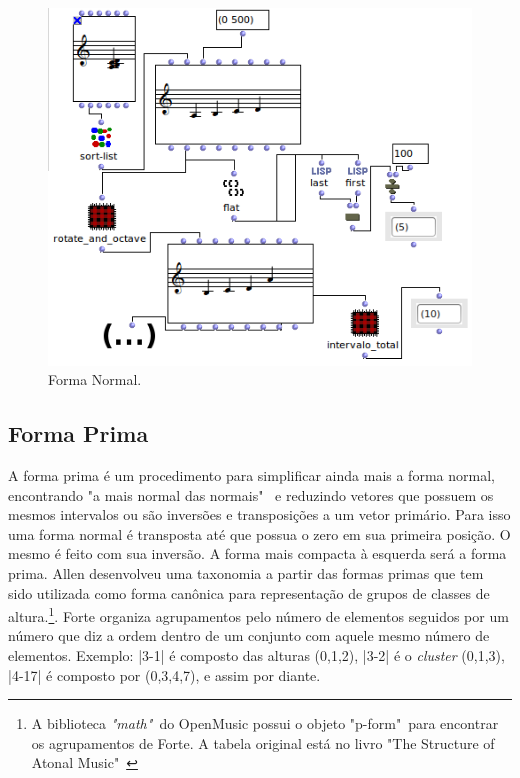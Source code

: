 \documentclass[
	12pt,				%
	openright,			%
	twoside,			%
	a4paper,			%
	english,			%
	french,				%
	spanish,			%
	brazil				%
	]{abntex2}
\begin{document}
\begin{figure}[h]
	\caption{\label{fig_grafico}Forma Normal. }
	\begin{center}
	    \includegraphics[scale=0.7]{OM_settheory/forma_normal.png}
	\end{center}
\end{figure}



\pagebreak
\subsection{Forma Prima} 

A forma prima é um procedimento para simplificar ainda mais a forma normal, encontrando "a mais normal das normais"\ \cite[p. 47]{straus2004} e reduzindo vetores que possuem os mesmos intervalos ou são inversões e transposições a um vetor primário. Para isso uma forma normal é transposta até que possua o zero em sua primeira posição. O mesmo é feito com sua inversão. A forma mais compacta à esquerda será a forma prima. Allen  desenvolveu uma taxonomia a partir das formas primas que tem sido utilizada como forma canônica para representação de grupos de classes de altura.\footnote{A biblioteca \textit{"math"}\ do OpenMusic possui o objeto "p-form"\ para encontrar os agrupamentos de Forte. A tabela original está no livro "The Structure of Atonal Music"\ \cite[p.179-181]{forte1973structure}}. Forte organiza agrupamentos pelo número de elementos seguidos por um número que diz a ordem dentro de um conjunto com aquele mesmo número de elementos. Exemplo: |3-1| é composto das alturas (0,1,2), |3-2|  é o \textit{cluster} (0,1,3), |4-17|  é composto por (0,3,4,7), e assim por diante.
\end{document}
